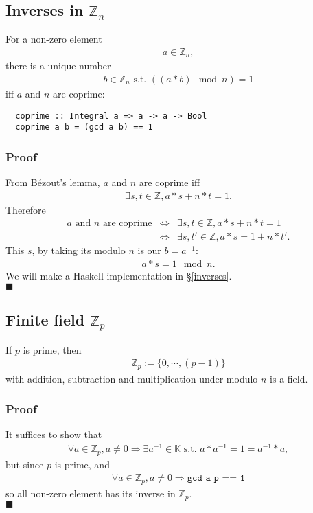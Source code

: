 \documentclass[11pt]{book}
\begin{document}
\subsection{Inverses in $\mathbb{Z}_n$}
For a non-zero element
\begin{eqnarray}
a \in \mathbb{Z}_n,
\end{eqnarray}
there is a unique number 
\begin{eqnarray}
b \in \mathbb{Z}_n \text{ s.t. } ((a*b) \mod n) = 1
\end{eqnarray}
iff $a$ and $n$ are coprime:
\begin{verbatim}
  coprime :: Integral a => a -> a -> Bool
  coprime a b = (gcd a b) == 1
\end{verbatim}


\subsubsection{Proof}
From B\'ezout's lemma, $a$ and $n$ are coprime iff
\begin{eqnarray}
\exists s,t \in \mathbb{Z}, a*s + n*t = 1.
\end{eqnarray}
Therefore
\begin{eqnarray}
\text{$a$ and $n$ are coprime} &\Leftrightarrow& \exists s,t \in \mathbb{Z}, a*s + n*t = 1 \\
&\Leftrightarrow &\exists s,t' \in \mathbb{Z}, a*s = 1 + n*t'.
\end{eqnarray}
This $s$, by taking its modulo $n$ is our $b = a^{-1}$:
\begin{eqnarray}
a*s = 1 \mod n.
\end{eqnarray}
We will make a Haskell implementation in \S\ref{inverses}.\\
$\blacksquare$

\subsection{Finite field $\mathbb{Z}_p$}
If $p$ is prime, then 
\begin{eqnarray}
\mathbb{Z}_p := \{0, \cdots, (p-1)\}
\end{eqnarray}
with addition, subtraction and multiplication under modulo $n$ is a field.

\subsubsection{Proof}
It suffices to show that 
\begin{eqnarray}
\forall a \in \mathbb{Z}_p, a \neq 0 \Rightarrow \exists a^{-1} \in \mathbb{K} \text{ s.t. } a*a^{-1} = 1 = a^{-1}*a,
\end{eqnarray}
but since $p$ is prime, and
\begin{eqnarray}
\forall a \in \mathbb{Z}_p, a \neq 0 \Rightarrow \texttt{gcd a p == 1}
\end{eqnarray}
so all non-zero element has its inverse in $ \mathbb{Z}_p$.\\
$\blacksquare$
\end{document}
